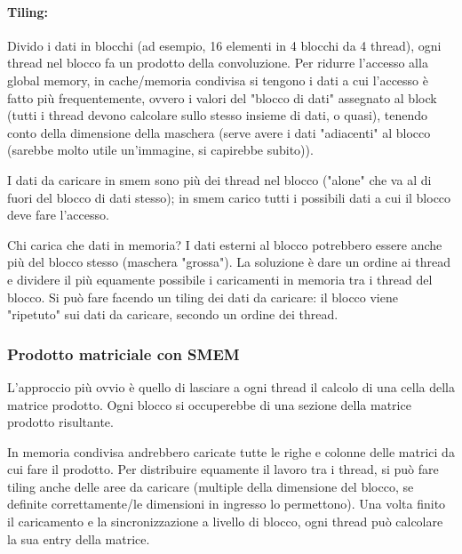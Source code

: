 \paragraph{Tiling:} Divido i dati in blocchi (ad esempio, 16 elementi in 4 blocchi da 4 thread), ogni thread nel blocco fa un prodotto della convoluzione. Per ridurre l'accesso alla global memory, in cache/memoria condivisa si tengono i dati a cui l'accesso è fatto più frequentemente, ovvero i valori del "blocco di dati" assegnato al block (tutti i thread devono calcolare sullo stesso insieme di dati, o quasi), tenendo conto della dimensione della maschera (serve avere i dati "adiacenti" al blocco (sarebbe molto utile un'immagine, si capirebbe subito)).

I dati da caricare in smem sono più dei thread nel blocco ("alone" che va al di fuori del blocco di dati stesso); in smem carico tutti i possibili dati a cui il blocco deve fare l'accesso. 

Chi carica che dati in memoria? I dati esterni al blocco potrebbero essere anche più del blocco stesso (maschera "grossa"). La soluzione è dare un ordine ai thread e dividere il più equamente possibile i caricamenti in memoria tra i thread del blocco. Si può fare facendo un tiling dei dati da caricare: il blocco viene "ripetuto" sui dati da caricare, secondo un ordine dei thread.

\subsubsection{Prodotto matriciale con SMEM}

L'approccio più ovvio è quello di lasciare a ogni thread il calcolo di una cella della matrice prodotto. Ogni blocco si occuperebbe di una sezione della matrice prodotto risultante. 

In memoria condivisa andrebbero caricate tutte le righe e colonne delle matrici da cui fare il prodotto. Per distribuire equamente il lavoro tra i thread, si può fare tiling anche delle aree da caricare (multiple della dimensione del blocco, se definite correttamente/le dimensioni in ingresso lo permettono). Una volta finito il caricamento e la sincronizzazione a livello di blocco, ogni thread può calcolare la sua entry della matrice.

